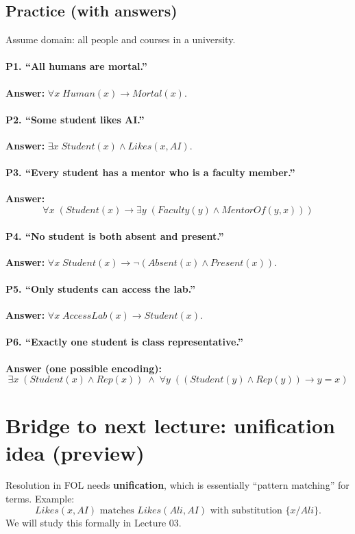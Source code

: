 \documentclass[11pt]{article}
\begin{document}
\subsection{Practice (with answers)}
Assume domain: all people and courses in a university.

\paragraph{P1. ``All humans are mortal.''}
\textbf{Answer:} $\forall x\; Human(x) \rightarrow Mortal(x)$.

\paragraph{P2. ``Some student likes AI.''}
\textbf{Answer:} $\exists x\; Student(x) \land Likes(x, AI)$.

\paragraph{P3. ``Every student has a mentor who is a faculty member.''}
\textbf{Answer:}
\[
  \forall x\; (Student(x) \rightarrow \exists y\; (Faculty(y) \land MentorOf(y,x)))
\]

\paragraph{P4. ``No student is both absent and present.''}
\textbf{Answer:} $\forall x\; Student(x) \rightarrow \lnot(Absent(x) \land Present(x))$.

\paragraph{P5. ``Only students can access the lab.''}
\textbf{Answer:} $\forall x\; AccessLab(x) \rightarrow Student(x)$.

\paragraph{P6. ``Exactly one student is class representative.''}
\textbf{Answer (one possible encoding):}
\[
  \exists x\; (Student(x)\land Rep(x)) \;\land\;
  \forall y\; ((Student(y)\land Rep(y)) \rightarrow y=x)
\]

\section{Bridge to next lecture: unification idea (preview)}
Resolution in FOL needs \textbf{unification}, which is essentially ``pattern matching'' for terms.
Example:
\[
  Likes(x, AI) \text{ matches } Likes(Ali, AI) \text{ with substitution } \{x/Ali\}.
\]
We will study this formally in Lecture 03.
\end{document}
